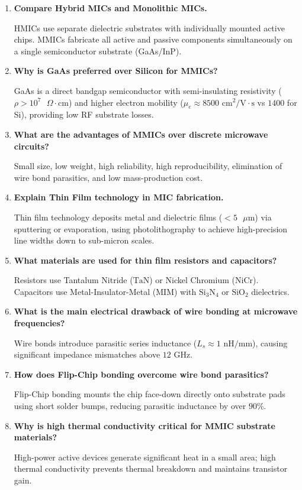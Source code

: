 \documentclass[12pt,a4paper]{article}
\newcommand{\Q}[1]{\textbf{#1}\par\noindent\ignorespaces}
\begin{document}
\begin{tcolorbox}[exambox, title={\textbf{Frequently Asked / Viva Questions}}]
  \begin{enumerate}[topsep=0pt, label=\textbf{Q\arabic*.}, itemsep=5pt]
    \item \Q{Compare Hybrid MICs and Monolithic MICs.}
    HMICs use separate dielectric substrates with individually mounted active chips. MMICs fabricate all active and passive components simultaneously on a single semiconductor substrate (GaAs/InP).

    \item \Q{Why is GaAs preferred over Silicon for MMICs?}
    GaAs is a direct bandgap semiconductor with semi-insulating resistivity ($\rho > 10^7\text{ }\Omega\cdot\text{cm}$) and higher electron mobility ($\mu_e \approx 8500\text{ cm}^2/\text{V}\cdot\text{s}$ vs $1400$ for Si), providing low RF substrate losses.

    \item \Q{What are the advantages of MMICs over discrete microwave circuits?}
    Small size, low weight, high reliability, high reproducibility, elimination of wire bond parasitics, and low mass-production cost.

    \item \Q{Explain Thin Film technology in MIC fabrication.}
    Thin film technology deposits metal and dielectric films ($<5\text{ }\mu\text{m}$) via sputtering or evaporation, using photolithography to achieve high-precision line widths down to sub-micron scales.

    \item \Q{What materials are used for thin film resistors and capacitors?}
    Resistors use Tantalum Nitride ($\text{TaN}$) or Nickel Chromium ($\text{NiCr}$). Capacitors use Metal-Insulator-Metal (MIM) with $\text{Si}_3\text{N}_4$ or $\text{SiO}_2$ dielectrics.

    \item \Q{What is the main electrical drawback of wire bonding at microwave frequencies?}
    Wire bonds introduce parasitic series inductance ($L_s \approx 1\text{ nH/mm}$), causing significant impedance mismatches above $12\text{ GHz}$.

    \item \Q{How does Flip-Chip bonding overcome wire bond parasitics?}
    Flip-Chip bonding mounts the chip face-down directly onto substrate pads using short solder bumps, reducing parasitic inductance by over $90\%$.

    \item \Q{Why is high thermal conductivity critical for MMIC substrate materials?}
    High-power active devices generate significant heat in a small area; high thermal conductivity prevents thermal breakdown and maintains transistor gain.


\end{enumerate}
\end{tcolorbox}
\end{document}

